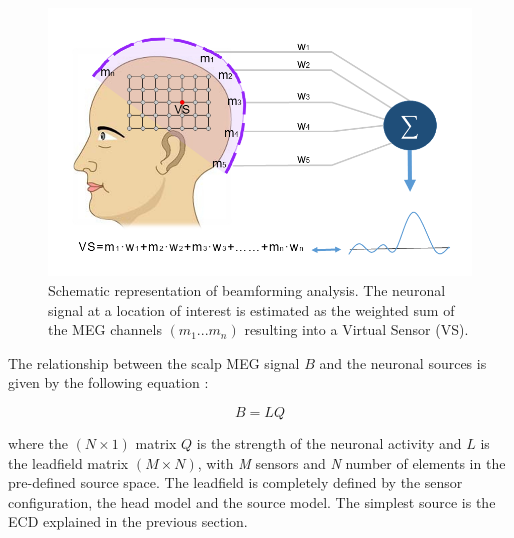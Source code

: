 \begin{figure}[ht]
\centering
\includegraphics[width=1\textwidth]{Images/beamformer.png}
\caption{Schematic representation of beamforming analysis. The neuronal signal at a location of interest is estimated as the weighted sum of the MEG channels $(m_1...m_n)$ resulting into a Virtual Sensor (VS).}
\label{fig:beamformerVS}
\end{figure}   

The relationship between the scalp MEG signal $B$ and the neuronal sources is given by the following equation \citep{Hamalainen1993}:

\begin{equation}
B = LQ
\end{equation}

where the $(N \times 1)$ matrix $Q$ is the strength of the neuronal activity and $L$ is the leadfield matrix $(M \times N)$, with \emph{M} sensors and \emph{N} number of elements in the pre-defined source space. The leadfield is completely defined by the sensor configuration, the head model and the source model. The simplest source is the ECD explained in the previous section. 

